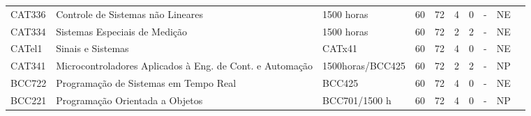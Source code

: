 \begin{table}[tbp]
{\begin{tabular}{llllllllll}
			\multicolumn{1}{|l|}{CAT336}                    & \multicolumn{1}{l|}{Controle de Sistemas não Lineares}                                    & \multicolumn{1}{l|}{1500 horas}             & \multicolumn{1}{l|}{60}                                                           & \multicolumn{1}{l|}{72}               & \multicolumn{1}{l|}{4}  & \multicolumn{1}{l|}{0}  & \multicolumn{1}{l|}{-}                & \multicolumn{1}{l|}{NE}            &  \\ \cline{1-9}
			\multicolumn{1}{|l|}{CAT334}                    & \multicolumn{1}{l|}{Sistemas Especiais de Medição}                                        & \multicolumn{1}{l|}{1500 horas}             & \multicolumn{1}{l|}{60}                                                           & \multicolumn{1}{l|}{72}               & \multicolumn{1}{l|}{2}  & \multicolumn{1}{l|}{2}  & \multicolumn{1}{l|}{-}                & \multicolumn{1}{l|}{NE}            &  \\ \cline{1-9}
			\multicolumn{1}{|l|}{CATel1}                    & \multicolumn{1}{l|}{Sinais e Sistemas}                                                    & \multicolumn{1}{l|}{CATx41}                 & \multicolumn{1}{l|}{60}                                                           & \multicolumn{1}{l|}{72}               & \multicolumn{1}{l|}{4}  & \multicolumn{1}{l|}{0}  & \multicolumn{1}{l|}{-}                & \multicolumn{1}{l|}{NE}            &  \\ \cline{1-9}
			\multicolumn{1}{|l|}{CAT341}                    & \multicolumn{1}{l|}{Microcontroladores Aplicados à Eng. de Cont. e Automação}             & \multicolumn{1}{l|}{1500horas/BCC425}       & \multicolumn{1}{l|}{60}                                                           & \multicolumn{1}{l|}{72}               & \multicolumn{1}{l|}{2}  & \multicolumn{1}{l|}{2}  & \multicolumn{1}{l|}{-}                & \multicolumn{1}{l|}{NP}            &  \\ \cline{1-9}
			\multicolumn{1}{|l|}{BCC722}                    & \multicolumn{1}{l|}{Programação de Sistemas em Tempo Real}                                & \multicolumn{1}{l|}{BCC425}                 & \multicolumn{1}{l|}{60}                                                           & \multicolumn{1}{l|}{72}               & \multicolumn{1}{l|}{4}  & \multicolumn{1}{l|}{0}  & \multicolumn{1}{l|}{-}                & \multicolumn{1}{l|}{NE}            &  \\ \cline{1-9}
			\multicolumn{1}{|l|}{BCC221}                    & \multicolumn{1}{l|}{Programação Orientada a Objetos}                                      & \multicolumn{1}{l|}{BCC701/1500 h}          & \multicolumn{1}{l|}{60}                                                           & \multicolumn{1}{l|}{72}               & \multicolumn{1}{l|}{4}  & \multicolumn{1}{l|}{0}  & \multicolumn{1}{l|}{-}                & \multicolumn{1}{l|}{NP}            &  \\ \cline{1-9}

\end{tabular}}
\end{table}
